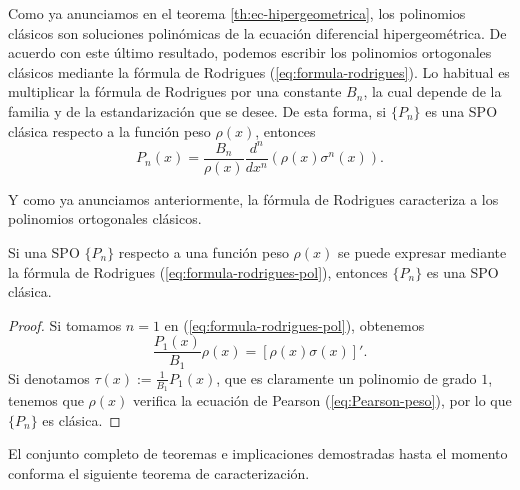 Como ya anunciamos en el teorema \ref{th:ec-hipergeometrica}, los polinomios clásicos son soluciones polinómicas de la ecuación diferencial hipergeométrica. De acuerdo con este último resultado, podemos escribir los polinomios ortogonales clásicos mediante la fórmula de Rodrigues (\ref{eq:formula-rodrigues}). Lo habitual es multiplicar la fórmula de Rodrigues por una constante $B_n$, la cual depende de la familia y de la estandarización que se desee. De esta forma, si $\{P_n\}$ es una SPO clásica respecto a la función peso $\rho(x)$, entonces
\begin{equation}
    \label{eq:formula-rodrigues-pol}
    P_n(x) = \dfrac {B_n}{\rho(x)} \frac{d^n}{d x^n}(\rho(x)\sigma^n(x)). 
\end{equation} 

Y como ya anunciamos anteriormente, la fórmula de Rodrigues caracteriza a los polinomios ortogonales clásicos.

\begin{teorema}
    Si una SPO $\{P_n\}$ respecto a una función peso $\rho(x)$ se puede expresar mediante la fórmula de Rodrigues (\ref{eq:formula-rodrigues-pol}), entonces $\{P_n\}$ es una SPO clásica.
\end{teorema}
\begin{proof}
    Si tomamos $n=1$ en (\ref{eq:formula-rodrigues-pol}), obtenemos
    $$
    \frac{P_1(x)}{B_1}\rho(x) = [\rho(x)\sigma(x)]'.
    $$
    Si denotamos $\tau(x):=\frac{1}{B_1}P_1(x)$, que es claramente un polinomio de grado $1$, tenemos que $\rho(x)$ verifica la ecuación de Pearson (\ref{eq:Pearson-peso}), por lo que $\{P_n\}$ es clásica.
\end{proof}

El conjunto completo de teoremas e implicaciones demostradas hasta el momento conforma el siguiente teorema de caracterización.

